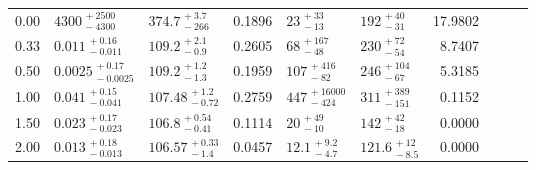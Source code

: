 \begin{tabular}{@{}rllr llr llr @{}}
\cmidrule(lr){1-7}
0.00 & ${4300}^{\,+2500}_{\,-4300}$ & ${374.7}^{\,+3.7}_{\,-266}$ & 0.1896
     & ${23}^{\,+33}_{\,-13}$ & ${192}^{\,+40}_{\,-31}$ & 17.9802\\[1.5pt]
0.33 & ${0.011}^{\,+0.16}_{\,-0.011}$ & ${109.2}^{\,+2.1}_{\,-0.9}$ & 0.2605
     & ${68}^{\,+167}_{\,-48}$ & ${230}^{\,+72}_{\,-54}$ & 8.7407\\[1.5pt]
0.50 & ${0.0025}^{\,+0.17}_{\,-0.0025}$ & ${109.2}^{\,+1.2}_{\,-1.3}$ & 0.1959
     & ${107}^{\,+416}_{\,-82}$ & ${246}^{\,+104}_{\,-67}$ & 5.3185\\[1.5pt]
1.00 & ${0.041}^{\,+0.15}_{\,-0.041}$ & ${107.48}^{\,+1.2}_{\,-0.72}$ & 0.2759
     & ${447}^{\,+16000}_{\,-424}$ & ${311}^{\,+389}_{\,-151}$ & 0.1152\\[1.5pt]
1.50 & ${0.023}^{\,+0.17}_{\,-0.023}$ & ${106.8}^{\,+0.54}_{\,-0.41}$ & 0.1114
     & ${20}^{\,+49}_{\,-10}$ & ${142}^{\,+42}_{\,-18}$ & 0.0000\\[1.5pt]
2.00 & ${0.013}^{\,+0.18}_{\,-0.013}$ & ${106.57}^{\,+0.33}_{\,-1.4}$ & 0.0457
     & ${12.1}^{\,+9.2}_{\,-4.7}$ & ${121.6}^{\,+12}_{\,-8.5}$ & 0.0000\\

\bottomrule
\end{tabular}
